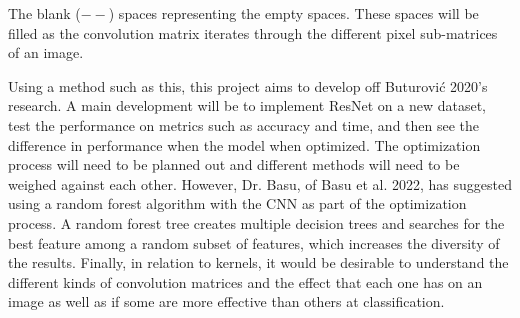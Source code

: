 \documentclass[10pt,twocolumn]{article}
\begin{document}
The blank ($--$) spaces representing the empty spaces. These spaces will be filled as the convolution matrix iterates through the different pixel sub-matrices of an image.

Using a method such as this, this project aims to develop off Buturovi{\'c} 2020’s research.
A main development will be to implement ResNet on a new dataset, test the performance on metrics such as accuracy and time, and then see the difference in performance when the model when optimized.
The optimization process will need to be planned out and different methods will need to be weighed against each other.
However, Dr. Basu, of Basu et al. 2022, has suggested using a random forest algorithm with the CNN as part of the optimization process.
A random forest tree creates multiple decision trees and searches for the best feature among a random subset of features, which increases the diversity of the results.
Finally, in relation to kernels, it would be desirable to understand the different kinds of convolution matrices and the effect that each one has on an image as well as if some are more effective than others at classification.

\printbibliography 
\end{document}
